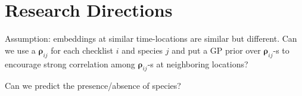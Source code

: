 \documentclass{article}
\newcommand{\wt}{\boldsymbol{\rho}}
\begin{document}
\section{Research Directions}

Assumption: embeddings at similar time-locations are similar but different. Can we use a $\wt_{ij}$ for each checklist $i$ and species $j$ and put a GP prior over $\wt_{ij}$-s to encourage strong correlation among $\wt_{ij}$-s at neighboring locations?  

Can we predict the presence/absence of species?
\end{document}
